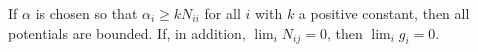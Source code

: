 If $\alpha$ is chosen so that $\alpha_i \geq kN_{ii}$ for all $i$ with $k$ a positive constant, then all potentials are bounded. If, in addition, $\lim_i N_{ij} = 0$, then $\lim_i g_i = 0$.
